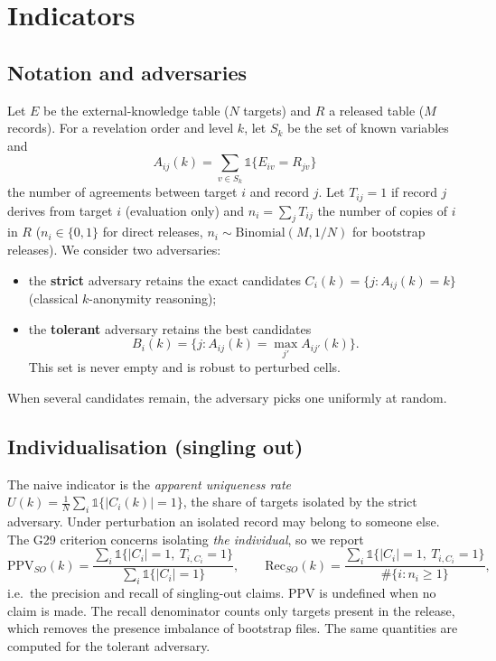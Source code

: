 \documentclass[preprint,12pt]{elsarticle}
\newcommand{\G}{G29}
\begin{document}
\section{Indicators}
\label{sec:indicators}

\subsection{Notation and adversaries}
Let $E$ be the external-knowledge table ($N$ targets) and $R$ a released table ($M$ records). For a revelation order and level $k$, let $S_k$ be the set of known variables and
\[
A_{ij}(k) = \sum_{v\in S_k} \mathbb{1}\{E_{iv}=R_{jv}\}
\]
the number of agreements between target $i$ and record $j$. Let $T_{ij}=1$ if record $j$ derives from target $i$ (evaluation only) and $n_i=\sum_j T_{ij}$ the number of copies of $i$ in $R$ ($n_i\in\{0,1\}$ for direct releases, $n_i\sim\mathrm{Binomial}(M,1/N)$ for bootstrap releases). We consider two adversaries:
\begin{itemize}
\item the \textbf{strict} adversary retains the exact candidates $C_i(k)=\{j : A_{ij}(k)=k\}$ (classical $k$-anonymity reasoning);
\item the \textbf{tolerant} adversary retains the best candidates \[B_i(k)=\{j : A_{ij}(k)=\textstyle\max_{j'}A_{ij'}(k)\}.\] This set is never empty and is robust to perturbed cells.
\end{itemize}
When several candidates remain, the adversary picks one uniformly at random.

\subsection{Individualisation (singling out)}
The naive indicator is the \emph{apparent uniqueness rate}
$U(k)=\frac1N\sum_i \mathbb{1}\{|C_i(k)|=1\}$, the share of targets isolated by the strict adversary. Under perturbation an isolated record may belong to someone else. The \G{} criterion concerns isolating \emph{the individual}, so we report
\begin{equation}
\mathrm{PPV}_{SO}(k)=\frac{\sum_i \mathbb{1}\{|C_i|=1,\ T_{i,C_i}=1\}}{\sum_i \mathbb{1}\{|C_i|=1\}},\qquad
\mathrm{Rec}_{SO}(k)=\frac{\sum_i \mathbb{1}\{|C_i|=1,\ T_{i,C_i}=1\}}{\#\{i:n_i\ge1\}},
\end{equation}
i.e.\ the precision and recall of singling-out claims. PPV is undefined when no claim is made. The recall denominator counts only targets present in the release, which removes the presence imbalance of bootstrap files. The same quantities are computed for the tolerant adversary.
\end{document}
